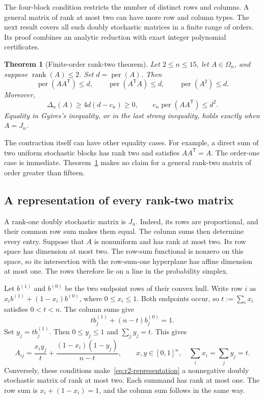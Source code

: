\documentclass[11pt,a4paper]{article}
\newtheorem{theorem}{Theorem}[section]
\theoremstyle{definition}
\theoremstyle{remark}
\newcommand{\per}{\operatorname{per}}
\newcommand{\T}{\mathsf{T}}
\begin{document}
The four-block condition restricts the number of distinct rows and columns.
A general matrix of rank at most two can have more row and column types.
The next result covers all such doubly stochastic matrices in a finite range of orders.
Its proof combines an analytic reduction with exact integer polynomial certificates.

\begin{theorem}[Finite-order rank-two theorem]\label{thm:rank-two-finite}
Let $2\le n\le15$, let $A\in\Omega_n$, and suppose $\operatorname{rank}(A)\le2$.
Set $d=\per(A)$. Then
\begin{equation}\label{eq:r2-contractions}
\per(AA^\T)\le d,\qquad \per(A^\T A)\le d,\qquad \per(A^2)\le d.
\end{equation}
Moreover,
\begin{equation}\label{eq:r2-margin}
\Delta_n(A)\ge4d(d-c_n)\ge0,
\qquad c_n\per(AA^\T)\le d^2.
\end{equation}
Equality in Gyires's inequality, or in the last strong inequality, holds exactly when $A=J_n$.
\end{theorem}

The contraction itself can have other equality cases.
For example, a direct sum of two uniform stochastic blocks has rank two and satisfies $AA^\T=A$.
The order-one case is immediate.
Theorem~\ref{thm:rank-two-finite} makes no claim for a general rank-two matrix of order greater than fifteen.

\subsection{A representation of every rank-two matrix}

A rank-one doubly stochastic matrix is $J_n$.
Indeed, its rows are proportional, and their common row sum makes them equal.
The column sums then determine every entry.
Suppose that $A$ is nonuniform and has rank at most two.
Its row space has dimension at most two.
The row-sum functional is nonzero on this space, so its intersection with the row-sum-one hyperplane has affine dimension at most one.
The rows therefore lie on a line in the probability simplex.

Let $b^{(1)}$ and $b^{(0)}$ be the two endpoint rows of their convex hull.
Write row $i$ as $x_i b^{(1)}+(1-x_i)b^{(0)}$, where $0\le x_i\le1$.
Both endpoints occur, so $t:=\sum_i x_i$ satisfies $0<t<n$.
The column sums give
\[
t b^{(1)}_j+(n-t)b^{(0)}_j=1.
\]
Set $y_j=t b^{(1)}_j$.
Then $0\le y_j\le1$ and $\sum_jy_j=t$.
This gives
\begin{equation}\label{eq:r2-representation}
A_{ij}=\frac{x_i y_j}{t}+\frac{(1-x_i)(1-y_j)}{n-t},
\qquad x,y\in[0,1]^n,\quad \sum_i x_i=\sum_j y_j=t.
\end{equation}
Conversely, these conditions make~\eqref{eq:r2-representation} a nonnegative doubly stochastic matrix of rank at most two.
Each summand has rank at most one.
The row sum is $x_i+(1-x_i)=1$, and the column sum follows in the same way.
\end{document}

